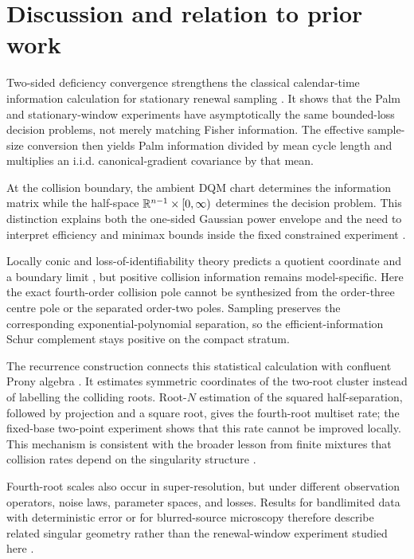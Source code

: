 \section{Discussion and relation to prior work}

Two-sided deficiency convergence strengthens the classical calendar-time
information calculation for stationary renewal sampling
\cite{GillKeiding2010RenewalSampling,ZhaoNagaraja2011WindowCensoredRenewal}.
It shows that the Palm and stationary-window experiments have asymptotically
the same bounded-loss decision problems, not merely matching Fisher
information.  The effective sample-size conversion then yields Palm
information divided by mean cycle length and multiplies an i.i.d.
canonical-gradient covariance by that mean.

At the collision boundary, the ambient DQM chart determines the information
matrix while the half-space \(\mathbb R^{n-1}\times[0,\infty)\) determines the
decision problem.  This distinction explains both the one-sided Gaussian
power envelope and the need to interpret efficiency and minimax bounds inside
the fixed constrained experiment
\cite{Chernoff1954LikelihoodRatio,SelfLiang1987NonstandardLRT}.

Locally conic and loss-of-identifiability theory predicts a quotient
coordinate and a boundary limit
\cite{DacunhaCastelleGassiat1997LocallyConic,LiuShao2003LossIdentifiability},
but positive collision information remains model-specific.  Here the exact
fourth-order collision pole cannot be synthesized from the order-three centre
pole or the separated order-two poles.  Sampling preserves the corresponding
exponential-polynomial separation, so the efficient-information Schur
complement stays positive on the compact stratum.

The recurrence construction connects this statistical calculation with
confluent Prony algebra
\cite{BatenkovYomdin2013ConfluentProny,KunisRoemerVonDerOhe2020Prony}.  It
estimates symmetric coordinates of the two-root cluster instead of labelling
the colliding roots.  Root-\(N\) estimation of the squared half-separation,
followed by projection and a square root, gives the fourth-root multiset rate;
the fixed-base two-point experiment shows that this rate cannot be improved
locally.  This mechanism is consistent with the broader lesson from finite
mixtures that collision rates depend on the singularity structure
\cite{Chen1995FiniteMixtureRate,HeinrichKahn2018FiniteMixtureMinimax,
HoNguyen2019SingularityStructures}.

Fourth-root scales also occur in super-resolution, but under different
observation operators, noise laws, parameter spaces, and losses.  Results for
bandlimited data with deterministic error or for blurred-source microscopy
therefore describe related singular geometry rather than the renewal-window
experiment studied here
\cite{BatenkovGoldmanYomdin2021SuperResolution,
KulaitisMunkWerner2021Resolution}.


